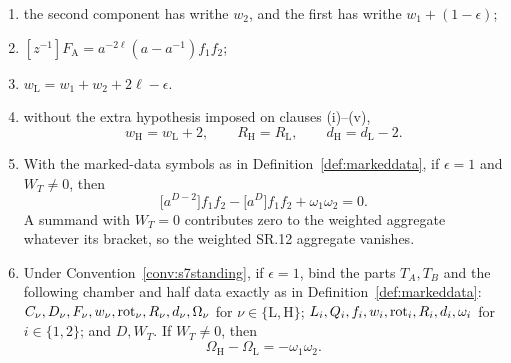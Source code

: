 \begin{lemma}
\begin{enumerate}
\item[(iii)] the second component has writhe $w_2$, and the first has writhe
$w_1+(1-\epsilon)$;
\item[(iv)] $[z^{-1}]F_{\mathrm A}=a^{-2\ell}(a-a^{-1})f_1f_2$;
\item[(v)] $w_{\mathrm L}=w_1+w_2+2\ell-\epsilon$.
\item[(vi)] without the extra hypothesis imposed on clauses (i)--(v),
\[
   w_{\mathrm H}=w_{\mathrm L}+2,\qquad R_{\mathrm H}=R_{\mathrm L},\qquad
   d_{\mathrm H}=d_{\mathrm L}-2.
\]

\item[(vii)] With the marked-data symbols as in Definition~\ref{def:markeddata},
if $\epsilon=1$ and $W_T\neq0$, then
\[
   \bigl[a^{D-2}\bigr]f_1f_2-\bigl[a^{D}\bigr]f_1f_2+\omega_1\omega_2=0 .
\]
A summand with $W_T=0$ contributes zero to the weighted aggregate whatever its
bracket, so the weighted SR.12 aggregate vanishes.

\item[(viii)] Under Convention~\ref{conv:s7standing}, if $\epsilon=1$, bind the parts $T_A,T_B$ and the following chamber and
half data exactly as in Definition~\ref{def:markeddata}:
$C_\nu,D_\nu,F_\nu,w_\nu,\operatorname{rot}_\nu,R_\nu,d_\nu,\Omega_\nu$ for
$\nu\in\{\mathrm L,\mathrm H\}$; $L_i,Q_i,f_i,w_i,\operatorname{rot}_i,R_i,d_i,\omega_i$
for $i\in\{1,2\}$; and $D,W_T$. If $W_T\neq0$, then
\[
   \Omega_{\mathrm H}-\Omega_{\mathrm L}=-\omega_1\omega_2.
\]
\end{enumerate}
\end{lemma}
